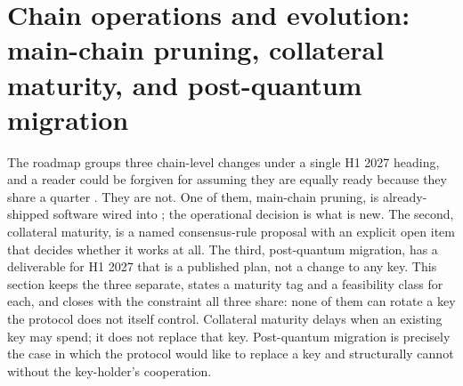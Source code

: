 \section{Chain operations and evolution: main-chain pruning, collateral maturity, and post-quantum migration}
\label{sec:chain-evolution}\label{sec:chain-ops}

The roadmap groups three chain-level changes under a single H1 2027 heading, and a reader could be
forgiven for assuming they are equally ready because they share a quarter
. They are not. One of them, main-chain pruning, is
already-shipped software wired into \fluxd; the operational decision is what is new. The second,
collateral maturity, is a named consensus-rule proposal with an explicit open item that decides
whether it works at all. The third, post-quantum migration, has a deliverable for H1 2027 that is a
published plan, not a change to any key. This section keeps the three separate, states a maturity
tag and a feasibility class for each, and closes with the constraint all three share: none of them can
rotate a key the protocol does not itself control. Collateral maturity delays when an existing key may
spend; it does not replace that key. Post-quantum migration is precisely the case in which the
protocol would like to replace a key and structurally cannot without the key-holder's cooperation.

